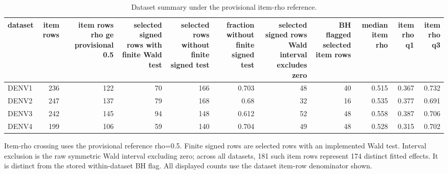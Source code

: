 \begin{table}[t]
  \centering
  \caption{Dataset summary under the provisional item-rho reference.}
  \label{tab:dataset_summary}
  \begin{tabular}{lrrrrrrrrrr}
    \toprule
    dataset & item rows & item rows rho ge provisional 0.5 & selected signed rows with finite Wald test & selected rows without finite signed test & fraction without finite signed test & selected signed rows Wald interval excludes zero & BH flagged selected item rows & median item rho & item rho q1 & item rho q3 \\
    \midrule
    DENV1 & 236 & 122 & 70 & 166 & 0.703 & 48 & 40 & 0.515 & 0.367 & 0.732 \\
    DENV2 & 247 & 137 & 79 & 168 & 0.68 & 32 & 16 & 0.535 & 0.377 & 0.691 \\
    DENV3 & 242 & 145 & 94 & 148 & 0.612 & 52 & 48 & 0.558 & 0.387 & 0.706 \\
    DENV4 & 199 & 106 & 59 & 140 & 0.704 & 49 & 48 & 0.528 & 0.315 & 0.702 \\
    \bottomrule
  \end{tabular}
  \par\smallskip
  \begin{minipage}{0.98\linewidth}\footnotesize
  Item-rho crossing uses the provisional reference rho=0.5. Finite signed rows are selected rows with an implemented Wald test. Interval exclusion is the raw symmetric Wald interval excluding zero; across all datasets, 181 such item rows represent 174 distinct fitted effects. It is distinct from the stored within-dataset BH flag. All displayed counts use the dataset item-row denominator shown.
  \end{minipage}
\end{table}
